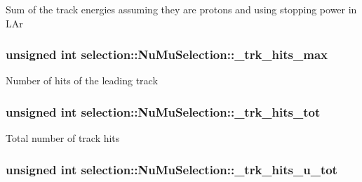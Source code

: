 Sum of the track energies assuming they are protons and using stopping power in L\-Ar \hypertarget{classselection_1_1NuMuSelection_a3e0166490638c0d08a3b66de9ed1ec91}{
\subsubsection[{\-\_\-trk\-\_\-hits\-\_\-max}]{\setlength{\rightskip}{0pt plus 5cm}unsigned int selection\-::\-Nu\-Mu\-Selection\-::\-\_\-trk\-\_\-hits\-\_\-max\hspace{0.3cm}{\ttfamily [private]}}}\label{classselection_1_1NuMuSelection_a3e0166490638c0d08a3b66de9ed1ec91}
Number of hits of the leading track \hypertarget{classselection_1_1NuMuSelection_abcc3673c89468d4af37e7936ac5716ea}{
\subsubsection[{\-\_\-trk\-\_\-hits\-\_\-tot}]{\setlength{\rightskip}{0pt plus 5cm}unsigned int selection\-::\-Nu\-Mu\-Selection\-::\-\_\-trk\-\_\-hits\-\_\-tot\hspace{0.3cm}{\ttfamily [private]}}}\label{classselection_1_1NuMuSelection_abcc3673c89468d4af37e7936ac5716ea}
Total number of track hits \hypertarget{classselection_1_1NuMuSelection_ab9a14b2e6823b5309c44d17e343087c6}{
\subsubsection[{\-\_\-trk\-\_\-hits\-\_\-u\-\_\-tot}]{\setlength{\rightskip}{0pt plus 5cm}unsigned int selection\-::\-Nu\-Mu\-Selection\-::\-\_\-trk\-\_\-hits\-\_\-u\-\_\-tot\hspace{0.3cm}{\ttfamily [private]}}}\label{classselection_1_1NuMuSelection_ab9a14b2e6823b5309c44d17e343087c6}
